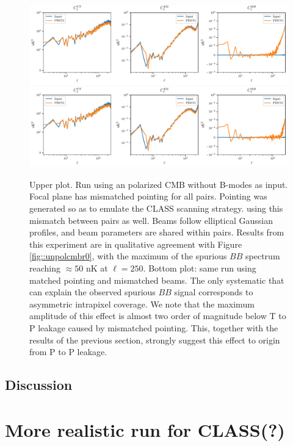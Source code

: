 \documentclass[a4paper,11pt]{article}
\begin{document}
\begin{figure}
	\centering
	\includegraphics[width=1.0\linewidth]{figures/cmb_r0d00_CLASS_mismatchedPointing_matchedBeams_ellipticalBeams.pdf}
	\includegraphics[width=1.0\linewidth]{figures/cmb_r0d00_CLASS_matchedPointing_matchedBeams_ellipticalBeams.pdf}
	\caption{Upper plot. Run using an polarized CMB without B-modes as input. Focal plane has mismatched pointing for all pairs. Pointing was generated so as to emulate the CLASS scanning strategy. using this mismatch between pairs as well. Beams follow elliptical Gaussian profiles, and beam parameters are shared within pairs. Results from this experiment are in qualitative agreement with Figure \ref{fig::unpolcmbr0}, with the maximum of the spurious $BB$ spectrum reaching $\approx 50$ nK at $\ell=250$. Bottom plot: same run using matched pointing and mismatched beams. The only systematic that can explain the observed spurious $BB$ signal corresponds to asymmetric intrapixel coverage. We note that the maximum amplitude of this effect is almost two order of magnitude below  T to P leakage caused by mismatched pointing. This, together with the results of the previous section, strongly suggest this effect to origin from P to P leakage. }
	
	\label{fig:unpolcmbr0}
\end{figure}

\subsection{Discussion}

\section{More realistic run for CLASS(?)}
\end{document}

